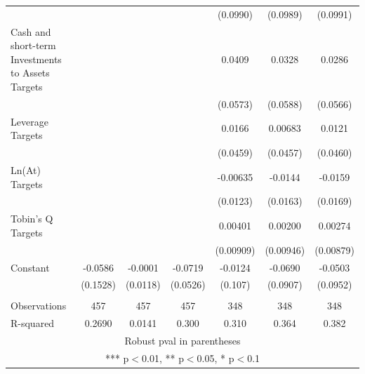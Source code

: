 \documentclass[12pt]{article}
\begin{document}
\begin{table}[ht]
\begin{adjustbox}{height=10cm, max width=\textwidth}
\begin{tabular}{lcccccc}
			&  &  &  & (0.0990) & (0.0989) & (0.0991) \\
		   Cash and short-term Investments to Assets Targets &  &  &  & 0.0409 & 0.0328 & 0.0286 \\
			&  &  &  & (0.0573) & (0.0588) & (0.0566) \\
		   Leverage Targets &  &  &  & 0.0166 & 0.00683 & 0.0121 \\
			&  &  &  & (0.0459) & (0.0457) & (0.0460) \\
		   Ln(At) Targets &  &  &  & -0.00635 & -0.0144 & -0.0159 \\
			&  &  &  & (0.0123) & (0.0163) & (0.0169) \\
		   Tobin's Q Targets &  &  &  & 0.00401 & 0.00200 & 0.00274 \\
			&  &  &  & (0.00909) & (0.00946) & (0.00879) \\
		   Constant & -0.0586 & -0.0001 & -0.0719 & -0.0124 & -0.0690 & -0.0503 \\
			& (0.1528) & (0.0118) & (0.0526) & (0.107) & (0.0907) & (0.0952) \\
			&  &  &  &  &  &  \\
		   Observations & 457 & 457 & 457 & 348 & 348 & 348 \\
			R-squared & 0.2690 & 0.0141 & 0.300 & 0.310 & 0.364 & 0.382 \\ \hline
		   \multicolumn{7}{c}{ Robust pval in parentheses} \\
		   \multicolumn{7}{c}{ *** p$<$0.01, ** p$<$0.05, * p$<$0.1} \\
		   \end{tabular}
		   
	\end{adjustbox}
	\end{table}
\end{document}
